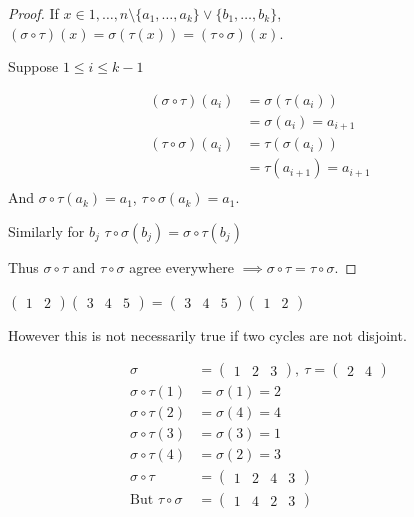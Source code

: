 \begin{proof}
If \(x \in {1, \ldots, n} \setminus \{ a_1, \ldots, a_k \} \lor \{ b_1, \ldots, b_k \}\), \((\sigma \circ \tau) (x) = \sigma \left( \tau(x) \right) = (\tau \circ \sigma)(x)\).

Suppose \(1 \leq i \leq k - 1\)

\begin{align*}
    (\sigma \circ \tau)(a_i) &= \sigma\left(\tau(a_i) \right) \\
    &= \sigma(a_i) = a_{i + 1} \\
    (\tau \circ \sigma)(a_i) &= \tau\left(\sigma(a_i) \right) \\
    &= \tau(a_{i + 1}) = a_{i + 1} \\
\end{align*}
And \(\sigma \circ \tau (a_k) = a_1\), \(\tau \circ \sigma (a_k) = a_1\).

Similarly for \(b_j\)
\(\tau \circ \sigma (b_j) = \sigma \circ \tau (b_j)\)

Thus \(\sigma \circ \tau\) and \(\tau \circ \sigma\) agree everywhere \(\implies \sigma \circ \tau = \tau \circ \sigma\).
\end{proof}

\begin{example}
\(\begin{pmatrix}1 & 2\end{pmatrix} \begin{pmatrix}3 & 4 & 5\end{pmatrix} = \begin{pmatrix}3 & 4 & 5\end{pmatrix} \begin{pmatrix}1 & 2\end{pmatrix}\)
\end{example}

However this is not necessarily true if two cycles are not disjoint.

\begin{example}
\begin{align*}
    \sigma &= \begin{pmatrix}1 & 2 & 3\end{pmatrix},\ \tau = \begin{pmatrix}2 & 4\end{pmatrix} \\
    \sigma \circ \tau(1) &= \sigma(1) = 2 \\
    \sigma \circ \tau(2) &= \sigma(4) = 4 \\
    \sigma \circ \tau(3) &= \sigma(3) = 1 \\
    \sigma \circ \tau(4) &= \sigma(2) = 3 \\
    \sigma \circ \tau &= \begin{pmatrix}1 & 2 & 4 & 3\end{pmatrix} \\
    \text{But } \tau \circ \sigma &= \begin{pmatrix} 1 & 4 & 2 & 3 \end{pmatrix}
\end{align*}
\end{example}


